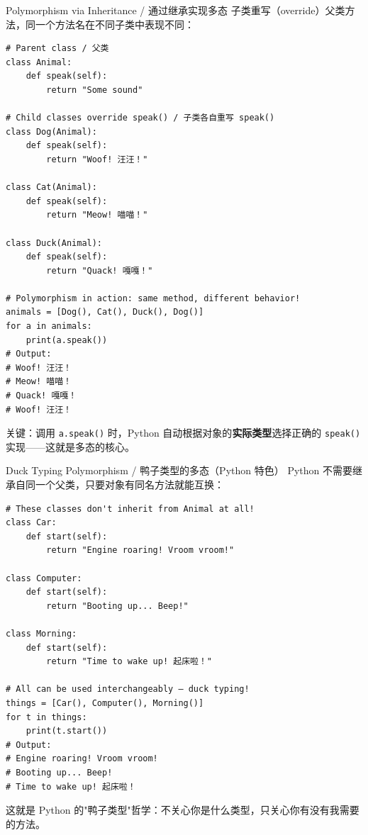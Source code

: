 \documentclass[11pt,a4paper]{report}
\let\oldtexttt\texttt
\renewcommand{\texttt}[1]{\textcolor{mainblue}{\oldtexttt{#1}}}
\begin{document}
\begin{examplebox}{Polymorphism via Inheritance / 通过继承实现多态}
    子类重写（override）父类方法，同一个方法名在不同子类中表现不同：
\begin{lstlisting}
# Parent class / 父类
class Animal:
    def speak(self):
        return "Some sound"

# Child classes override speak() / 子类各自重写 speak()
class Dog(Animal):
    def speak(self):
        return "Woof! 汪汪！"

class Cat(Animal):
    def speak(self):
        return "Meow! 喵喵！"

class Duck(Animal):
    def speak(self):
        return "Quack! 嘎嘎！"

# Polymorphism in action: same method, different behavior!
animals = [Dog(), Cat(), Duck(), Dog()]
for a in animals:
    print(a.speak())
# Output:
# Woof! 汪汪！
# Meow! 喵喵！
# Quack! 嘎嘎！
# Woof! 汪汪！
\end{lstlisting}
    关键：调用 \texttt{a.speak()} 时，Python 自动根据对象的\textbf{实际类型}选择正确的 \texttt{speak()} 实现——这就是多态的核心。
\end{examplebox}

\begin{examplebox}{Duck Typing Polymorphism / 鸭子类型的多态（Python 特色）}
    Python 不需要继承自同一个父类，只要对象有同名方法就能互换：
\begin{lstlisting}
# These classes don't inherit from Animal at all!
class Car:
    def start(self):
        return "Engine roaring! Vroom vroom!"

class Computer:
    def start(self):
        return "Booting up... Beep!"

class Morning:
    def start(self):
        return "Time to wake up! 起床啦！"

# All can be used interchangeably — duck typing!
things = [Car(), Computer(), Morning()]
for t in things:
    print(t.start())
# Output:
# Engine roaring! Vroom vroom!
# Booting up... Beep!
# Time to wake up! 起床啦！
\end{lstlisting}
    这就是 Python 的"鸭子类型"哲学：不关心你是什么类型，只关心你有没有我需要的方法。
\end{examplebox}
\end{document}
